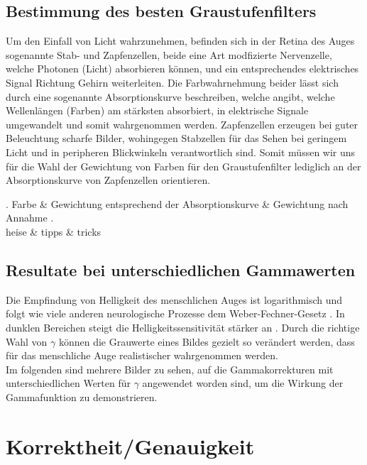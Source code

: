 \documentclass[course=erap]{aspdoc}
\begin{document}
\subsection{Bestimmung des besten Graustufenfilters}
Um den Einfall von Licht wahrzunehmen, befinden sich in der Retina des Auges sogenannte Stab- und Zapfenzellen, beide eine Art modfizierte Nervenzelle, welche Photonen (Licht) absorbieren können, und ein entsprechendes elektrisches Signal Richtung Gehirn weiterleiten.
Die Farbwahrnehmung beider lässt sich durch eine sogenannte Absorptionskurve beschreiben, welche angibt, welche Wellenlängen (Farben) am stärksten absorbiert, in elektrische Signale umgewandelt und somit wahrgenommen werden.
Zapfenzellen erzeugen bei guter Beleuchtung scharfe Bilder, wohingegen Stabzellen für das Sehen bei geringem Licht und in peripheren Blickwinkeln verantwortlich sind. Somit müssen wir uns für die Wahl der Gewichtung von Farben für den Graustufenfilter lediglich an der Absorptionskurve von Zapfenzellen orientieren.
\begin{tabular}
.		Farbe & Gewichtung entsprechend der Absorptionskurve & Gewichtung nach Annahme . \\
	heise & tipps & tricks \\
\end{tabular}

\subsection{Resultate bei unterschiedlichen Gammawerten}
Die Empfindung von Helligkeit des menschlichen Auges ist logarithmisch und folgt wie viele anderen neurologische Prozesse dem Weber-Fechner-Gesetz \cite{weberFechnerGesetz}. In dunklen Bereichen steigt die Helligkeitssensitivität stärker an \cite{Logarithmische_Helligkeitswahrnehmung}. Durch die richtige Wahl von $\gamma$ können die Grauwerte eines Bildes gezielt so verändert werden, dass für das menschliche Auge realistischer wahrgenommen werden. 
\\
\newline
Im folgenden sind mehrere Bilder zu sehen, auf die Gammakorrekturen mit unterschiedlichen Werten für $\gamma$ angewendet worden sind, um die Wirkung der Gammafunktion zu demonstrieren.    


\section{Korrektheit/Genauigkeit}
\end{document}
